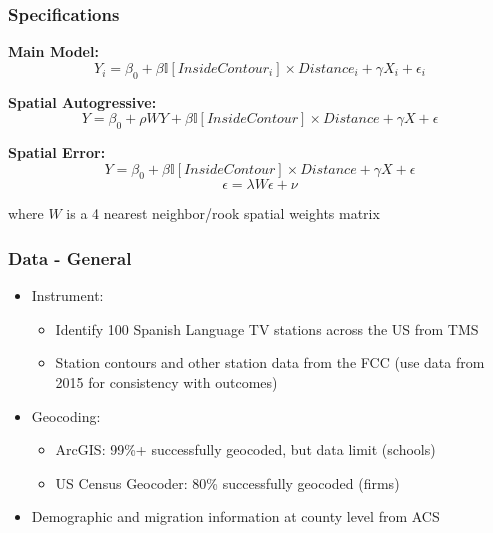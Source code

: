 \documentclass{beamer}
\begin{document}
\begin{frame}
\frametitle{Specifications}

\textbf{Main Model:}
\[ Y_i^{} = \beta_0 + \beta \mathbb{I}[InsideContour_i] \times Distance_i + \gamma X_i + \epsilon_i \]

\textbf{Spatial Autogressive:}
\[ Y = \beta_0 + \rho W Y + \beta \mathbb{I}[InsideContour] \times Distance + \gamma X + \epsilon \]

\textbf{Spatial Error:}
\[ Y = \beta_0 + \beta \mathbb{I}[InsideContour] \times Distance + \gamma X + \epsilon \]
\[\epsilon = \lambda W \epsilon + \nu\]

where $W$ is a 4 nearest neighbor/rook spatial weights matrix

\end{frame}




\begin{frame}
\frametitle{Data - General}

\begin{itemize}
\item Instrument:
\begin{itemize}
\item Identify 100 Spanish Language TV stations across the US from TMS
\item Station contours and other station data from the FCC (use data from 2015 for consistency with outcomes)
\end{itemize}
\item Geocoding:
\begin{itemize}
\item ArcGIS: 99\%+ successfully geocoded, but data limit (schools)
\item US Census Geocoder: 80\% successfully geocoded (firms)
\end{itemize}
\item Demographic and migration information at county level from ACS
\end{itemize}

\end{frame}
\end{document}
